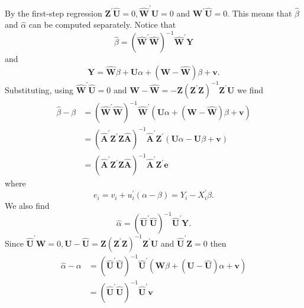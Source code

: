 \documentclass[10pt]{article}
\begin{document}
By the first-step regression $\boldsymbol{Z}^{\prime} \widehat{\boldsymbol{U}}=0, \widehat{\boldsymbol{W}}^{\prime} \widehat{\boldsymbol{U}}=0$ and $\boldsymbol{W}^{\prime} \widehat{\boldsymbol{U}}=0$. This means that $\widehat{\beta}$ and $\widehat{\alpha}$ can be computed separately. Notice that
$$
\widehat{\beta}=\left(\widehat{\boldsymbol{W}}^{\prime} \widehat{\boldsymbol{W}}\right)^{-1} \widehat{\boldsymbol{W}}^{\prime} \boldsymbol{Y}
$$
and
$$
\boldsymbol{Y}=\widehat{\boldsymbol{W}} \beta+\boldsymbol{U} \alpha+(\boldsymbol{W}-\widehat{\boldsymbol{W}}) \beta+\boldsymbol{v} .
$$
Substituting, using $\widehat{\boldsymbol{W}}^{\prime} \widehat{\boldsymbol{U}}=0$ and $\boldsymbol{W}-\widehat{\boldsymbol{W}}=-\boldsymbol{Z}\left(\boldsymbol{Z}^{\prime} \boldsymbol{Z}\right)^{-1} \boldsymbol{Z}^{\prime} \boldsymbol{U}$ we find
$$
\begin{aligned}
\widehat{\beta}-\beta &=\left(\widehat{\boldsymbol{W}}^{\prime} \widehat{\boldsymbol{W}}\right)^{-1} \widehat{\boldsymbol{W}}^{\prime}(\boldsymbol{U} \alpha+(\boldsymbol{W}-\widehat{\boldsymbol{W}}) \beta+\boldsymbol{v}) \\
&=\left(\widehat{\boldsymbol{A}}^{\prime} \boldsymbol{Z}^{\prime} \boldsymbol{Z} \widehat{\boldsymbol{A}}\right)^{-1} \widehat{\boldsymbol{A}}^{\prime} \boldsymbol{Z}^{\prime}(\boldsymbol{U} \alpha-\boldsymbol{U} \beta+\boldsymbol{v}) \\
&=\left(\widehat{\boldsymbol{A}}^{\prime} \boldsymbol{Z}^{\prime} \boldsymbol{Z} \widehat{\boldsymbol{A}}\right)^{-1} \widehat{\boldsymbol{A}}^{\prime} \boldsymbol{Z}^{\prime} \boldsymbol{e}
\end{aligned}
$$
where
$$
e_{i}=v_{i}+u_{i}^{\prime}(\alpha-\beta)=Y_{i}-X_{i}^{\prime} \beta .
$$
We also find
$$
\widehat{\alpha}=\left(\widehat{\boldsymbol{U}}^{\prime} \widehat{\boldsymbol{U}}\right)^{-1} \widehat{\boldsymbol{U}}^{\prime} \boldsymbol{Y} .
$$
Since $\widehat{\boldsymbol{U}}^{\prime} \boldsymbol{W}=0, \boldsymbol{U}-\widehat{\boldsymbol{U}}=\boldsymbol{Z}\left(\boldsymbol{Z}^{\prime} \boldsymbol{Z}\right)^{-1} \boldsymbol{Z}^{\prime} \boldsymbol{U}$ and $\widehat{\boldsymbol{U}}^{\prime} \boldsymbol{Z}=0$ then
$$
\begin{aligned}
\widehat{\alpha}-\alpha &=\left(\widehat{\boldsymbol{U}}^{\prime} \widehat{\boldsymbol{U}}\right)^{-1} \widehat{\boldsymbol{U}}^{\prime}(\boldsymbol{W} \beta+(\boldsymbol{U}-\widehat{\boldsymbol{U}}) \alpha+\boldsymbol{v}) \\
&=\left(\widehat{\boldsymbol{U}}^{\prime} \widehat{\boldsymbol{U}}\right)^{-1} \widehat{\boldsymbol{U}}^{\prime} \boldsymbol{v}
\end{aligned}
$$
\end{document}
